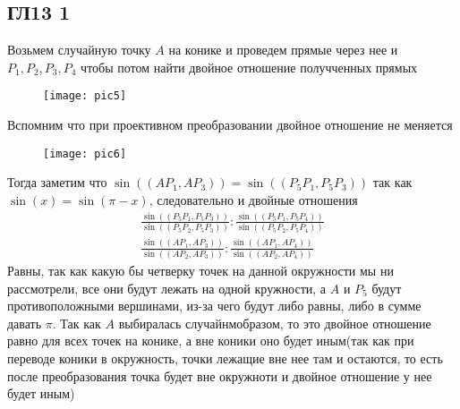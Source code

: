 \subsection*{ГЛ13 1}
Возьмем случайную точку $A$ на конике и проведем прямые через нее и $P_1,P_2,P_3,P_4$ чтобы потом найти двойное отношение получченных прямых
\begin{figure}[h]
	\texttt{[image: pic5]}
\end{figure}
Вспомним что при проективном преобразовании двойное отношение не меняется
\begin{figure}[h]
	\texttt{[image: pic6]}
\end{figure}
Тогда заметим что $\sin((AP_1,AP_3)) = \sin((P_5P_1,P_5P_3))$ так как $\sin(x) = \sin(\pi - x)$, следовательно и двойные отношения 
\begin{gather*}
	\frac{\sin((P_5P_1,P_5P_3))}{\sin((P_5P_2,P_5P_3))} : \frac{\sin((P_5P_1,P_5P_4))}{\sin((P_5P_2,P_5P_4))}\\
	\frac{\sin((AP_1,AP_3))}{\sin((AP_2,AP_3))} : \frac{\sin((AP_1,AP_4))}{\sin((AP_2,AP_4))}
\end{gather*}
Равны, так как какую бы четверку точек на данной окружности мы ни рассмотрели, все они будут лежать на одной кружности, а $A$ и $P_5$ будут противоположными вершинами, из-за чего будут либо равны, либо в сумме давать $\pi$. Так как $A$ выбиралась случайнмобразом, то это двойное отношение равно для всех точек на конике, а вне коники оно будет иным(так как при переводе коники в окружность, точки лежащие вне нее там и остаются, то есть после преобразования точка будет вне окружноти и двойное отношение у нее будет иным)
		